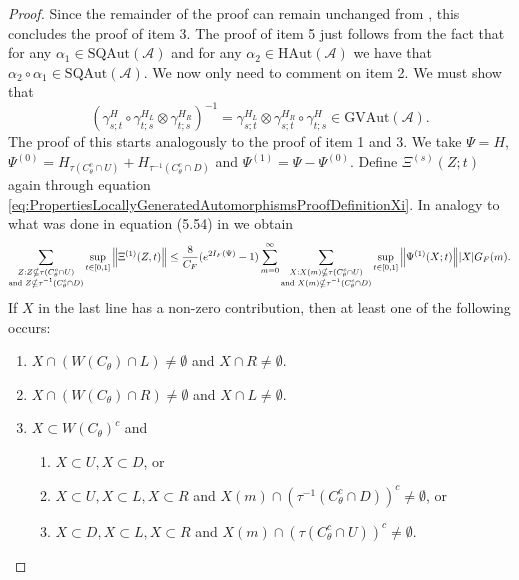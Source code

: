 \documentclass[12pt,a4paper,twoside]{article}
\renewcommand{\AA}{\mathcal A}
\theoremstyle{definition}
\numberwithin{equation}{section}
\begin{document}
\begin{proof}
	Since the remainder of the proof can remain unchanged from \cite{ogata2021h3gmathbb}, this concludes the proof of item 3. The proof of item 5 just follows from the fact that for any $\alpha_1\in\textrm{SQAut}(\AA)$ and for any $\alpha_2\in\textrm{HAut}(\AA)$ we have that $\alpha_2\circ\alpha_1\in\textrm{SQAut}(\AA)$. We now only need to comment on item 2. We must show that
	\begin{equation}
		(\gamma^H_{s;t}\circ\gamma^{H_L}_{t;s}\otimes\gamma^{H_R}_{t;s})^{-1}=\gamma^{H_L}_{s;t}\otimes\gamma^{H_R}_{s;t}\circ\gamma^H_{t;s}\in\textrm{GVAut}(\AA).
	\end{equation}
	The proof of this starts analogously to the proof of item 1 and 3. We take $\Psi=H$, $\Psi^{(0)}=H_{\tau(C_\theta^c\cap U)}+H_{\tau^{-1}(C_\theta^c\cap D)}$ and $\Psi^{(1)}=\Psi-\Psi^{(0)}$. Define $\Xi^{(s)}(Z;t)$ again through equation \eqref{eq:PropertiesLocallyGeneratedAutomorphismsProofDefinitionXi}. In analogy to what was done in equation (5.54) in \cite{ogata2021h3gmathbb} we obtain
	\begin{equation}
		\sum_{\substack{Z:Z\nsubseteq \tau(C_\theta^c\cap U)\\\text{and }Z\nsubseteq \tau^{-1}(C_\theta^c\cap D)}}\sup_{t\in[0,1]}\norm{\Xi^{(1)}(Z,t)}\leq \frac{8}{C_F}(e^{2I_F(\Psi)}-1)\sum_{m=0}^\infty\sum_{\substack{X:X(m)\nsubseteq \tau(C_\theta^c\cap U)\\\text{and }X(m)\nsubseteq \tau^{-1}(C_\theta^c\cap D)}} \sup_{t\in[0,1]}\norm{\Psi^{(1)}(X;t)}\abs{X}G_F(m).
	\end{equation}
	If $X$ in the last line has a non-zero contribution, then at least one of the following occurs:
	\begin{enumerate}
		\item $X\cap (W(C_\theta)\cap L)\neq\emptyset$ and $X\cap R\neq\emptyset$.
		\item $X\cap (W(C_\theta)\cap R)\neq\emptyset$ and $X\cap L\neq\emptyset$.
		\item $X\subset W(C_\theta)^c$ and
		\begin{enumerate}
			\item $X\subset U,X\subset D$, or
			\item $X\subset U,X\subset L,X\subset R$ and $X(m)\cap (\tau^{-1}(C_\theta^c\cap D))^c\neq \emptyset$, or
			\item $X\subset D,X\subset L,X\subset R$ and $X(m)\cap (\tau(C_\theta^c\cap U))^c\neq \emptyset$.
		\end{enumerate}
	\end{enumerate}

\end{proof}
\end{document}
